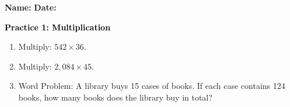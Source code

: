 \documentclass[12pt, letterpaper, fleqn]{article}
\begin{document}
\textbf{Name:} \underline{\hspace{5cm}}
\hfill
\textbf{Date:} \underline{\hspace{3cm}}\\

\begin{tcolorbox}[colback=customteal!20]
    \large\textcolor{black}{\textbf{Practice 1: Multiplication}}
\end{tcolorbox}
\begin{enumerate}[itemsep=3.5cm, leftmargin=0.6cm]
\item Multiply: $542 \times 36$.
\vspace{3.5cm}
\item Multiply: $2,084 \times 45$.
\vspace{3.5cm}
\item Word Problem: A library buys 15 cases of books. If each case contains 124 books, how many books does the library buy in total?
\end{enumerate}
\end{document}
